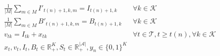 \documentclass[10pt]{article}
\newcommand{\ti}{t} %
\newcommand{\TI}{\mathcal{T}}
\newcommand{\ka}{k} %
\newcommand{\KA}{\mathcal{K}}
\newcommand{\Ka}{K}
\newcommand{\jey}{j} %
\newcommand{\Graf}{\mathcal{A}} %
\newcommand{\Bi}{B} %
\newcommand{\Csub}{\mathcal{K}^+_k}
\newcommand{\Psub}{\mathcal{K}^-_k}
\begin{document}
\begin{subequations}
\begin{flalign}
& \frac{1}{|M|} \sum_{m \in M} I'_{\ti(n)+1,k,m} = I_{\ti(n)+1, \ka} &\forall \ka \in \KA & \label{eq:Average_Inventory_o} \\
& \frac{1}{|M|} \sum_{m \in M} B'_{\ti(n)+1,k,m} = B_{\ti(n)+1, \ka} &\forall \ka \in \KA & \label{eq:Average_Backlog_o}\\
& v_{\ti \ka} = I_{\ti \ka} + x_{\ti \ka}  \quad &\forall \ti  \in \TI, t \geq \ti(n),\forall \ka \in \KA \\
&{x}_{ \ti },  {v}_{ \ti },  {I}_{ \ti} , {\Bi}_{ \ti } \in \mathbb{R}_{+}^{\Ka} , {S}_{\ti} \in \mathbb{R}_{+}^{|\Graf|} ,{y}_{ n } \in \{0,1\}^{\Ka} & \label{eq:Sub_FD_bound3_o}
\end{flalign}

  \end{subequations}
  
\end{document}
